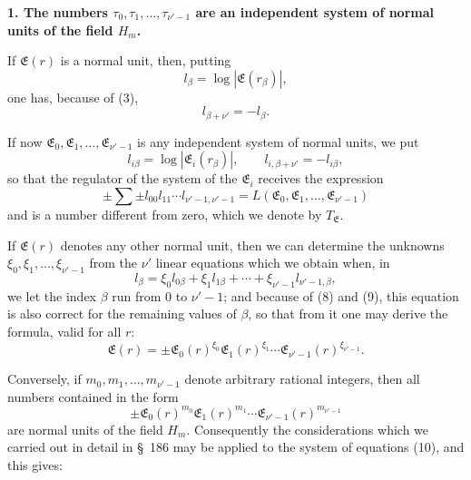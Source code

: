 \documentclass[11pt]{article}
\begin{document}
\begin{center}\textbf{1. The numbers $\tau_0,\tau_1,\ldots,\tau_{\nu'-1}$ are an independent system of normal units of the field $H_m$.}\end{center}

If $\mathfrak E(r)$ is a normal unit, then, putting
\begin{equation}
l_\beta=\log|\mathfrak E(r_\beta)|,
\tag{7}
\end{equation}
one has, because of (3),
\begin{equation}
l_{\beta+\nu'}=-l_\beta.
\tag{8}
\end{equation}

If now $\mathfrak E_0,\mathfrak E_1,\ldots,\mathfrak E_{\nu'-1}$ is any independent system of normal units, we put
\begin{equation}
l_{i\beta}=\log|\mathfrak E_i(r_\beta)|,\qquad l_{i,\beta+\nu'}=-l_{i\beta},
\tag{9}
\end{equation}
so that the regulator of the system of the $\mathfrak E_i$ receives the expression
\begin{equation}
\pm\sum\pm l_{00}l_{11}\cdots l_{\nu'-1,\nu'-1}=L(\mathfrak E_0,\mathfrak E_1,\ldots,\mathfrak E_{\nu'-1})
\tag{10}
\end{equation}
and is a number different from zero, which we denote by $T_\mathfrak E$.

If $\mathfrak E(r)$ denotes any other normal unit, then we can determine the unknowns $\xi_0,\xi_1,\ldots,\xi_{\nu'-1}$ from the $\nu'$ linear equations which we obtain when, in
\begin{equation}
l_\beta=\xi_0l_{0\beta}+\xi_1l_{1\beta}+\cdots+\xi_{\nu'-1}l_{\nu'-1,\beta},
\tag{11}
\end{equation}
we let the index $\beta$ run from $0$ to $\nu'-1$; and because of (8) and (9), this equation is also correct for the remaining values of $\beta$, so that from it one may derive the formula, valid for all $r$:
\begin{equation}
\mathfrak E(r)=\pm\mathfrak E_0(r)^{\xi_0}\mathfrak E_1(r)^{\xi_1}\cdots\mathfrak E_{\nu'-1}(r)^{\xi_{\nu'-1}}.
\tag{12}
\end{equation}

Conversely, if $m_0,m_1,\ldots,m_{\nu'-1}$ denote arbitrary rational integers, then all numbers contained in the form
\[
\pm\mathfrak E_0(r)^{m_0}\mathfrak E_1(r)^{m_1}\cdots\mathfrak E_{\nu'-1}(r)^{m_{\nu'-1}}
\]
are normal units of the field $H_m$. Consequently the considerations which we carried out in detail in \S~186 may be applied to the system of equations (10), and this gives:
\end{document}
